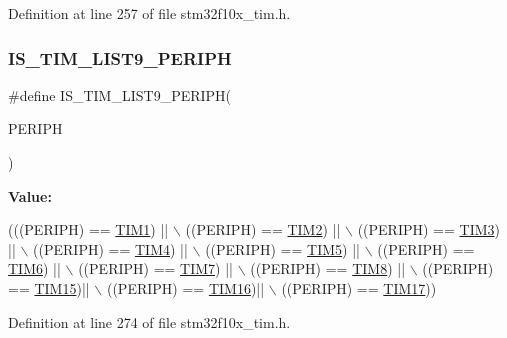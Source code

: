 Definition at line 257 of file stm32f10x\+\_\+tim.\+h.

\mbox{\label{group___t_i_m___exported__constants_ga24ff46311f2d074ec6bd93f2972d1d9b}} 
\subsubsection{\texorpdfstring{I\+S\+\_\+\+T\+I\+M\+\_\+\+L\+I\+S\+T9\+\_\+\+P\+E\+R\+I\+PH}{IS\_TIM\_LIST9\_PERIPH}}
{\footnotesize\ttfamily \#define I\+S\+\_\+\+T\+I\+M\+\_\+\+L\+I\+S\+T9\+\_\+\+P\+E\+R\+I\+PH(\begin{DoxyParamCaption}\item[{}]{P\+E\+R\+I\+PH }\end{DoxyParamCaption})}

{\bfseries Value\+:}
\begin{DoxyCode}
(((PERIPH) == \hyperlink{group___peripheral__declaration_ga2e87451fea8dc9380056d3cfc5ed81fb}{TIM1}) || \(\backslash\)
                                      ((PERIPH) == \hyperlink{group___peripheral__declaration_ga3cfac9f2e43673f790f8668d48b4b92b}{TIM2}) || \(\backslash\)
                                      ((PERIPH) == \hyperlink{group___peripheral__declaration_ga61ee4c391385607d7af432b63905fcc9}{TIM3}) || \(\backslash\)
                                      ((PERIPH) == \hyperlink{group___peripheral__declaration_ga91a09bad8bdc7a1cb3d85cf49c94c8ec}{TIM4}) || \(\backslash\)
                                      ((PERIPH) == \hyperlink{group___peripheral__declaration_ga5125ff6a23a2ed66e2e19bd196128c14}{TIM5}) || \(\backslash\)
                                      ((PERIPH) == \hyperlink{group___peripheral__declaration_gac7b4ed55f9201b498b38c962cca97314}{TIM6}) || \(\backslash\)
                                      ((PERIPH) == \hyperlink{group___peripheral__declaration_ga49267c49946fd61db6af8b49bcf16394}{TIM7}) || \(\backslash\)
                                      ((PERIPH) == \hyperlink{group___peripheral__declaration_ga9a3660400b17735e91331f256095810e}{TIM8}) || \(\backslash\)
                                      ((PERIPH) == \hyperlink{group___peripheral__declaration_ga87e4b442041d1c03a6af113fbe04a182}{TIM15})|| \(\backslash\)
                                      ((PERIPH) == \hyperlink{group___peripheral__declaration_ga73ec606e7dacf17e18c661e8ff8c7c8d}{TIM16})|| \(\backslash\)
                                      ((PERIPH) == \hyperlink{group___peripheral__declaration_ga65aea6c8b36439e44ad6cde0e6891aab}{TIM17}))
\end{DoxyCode}


Definition at line 274 of file stm32f10x\+\_\+tim.\+h.

